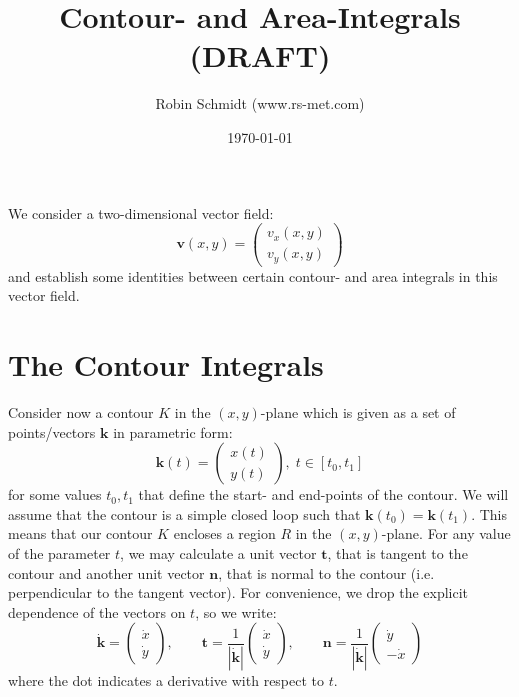 \title{Contour- and Area-Integrals (DRAFT)}
\author{Robin Schmidt (www.rs-met.com)}
\date{\today}
\maketitle

We consider a two-dimensional vector field:
\begin{equation}
 \mathbf{v}(x,y) = 
 \begin{pmatrix}
 v_x (x, y) \\
 v_y (x, y)
 \end{pmatrix}
\end{equation}
and establish some identities between certain contour- and area integrals in this vector field.

\section{The Contour Integrals}
Consider now a contour $K$ in the $(x,y)$-plane which is given as a set of points/vectors $\mathbf{k}$ in parametric form:
\begin{equation}
 \mathbf{k}(t) = 
 \begin{pmatrix}
 x (t) \\
 y (t)
 \end{pmatrix}, \; t \in [t_0, t_1]
\end{equation}
for some values $t_0, t_1$ that define the start- and end-points of the contour. We will assume that the contour is a simple closed loop such that $\mathbf{k}(t_0) = \mathbf{k}(t_1) $. This means that our contour $K$ encloses a region $R$ in the $(x,y)$-plane. For any value of the parameter $t$, we may calculate a unit vector $\mathbf{t}$, that is tangent to the contour and another unit vector $\mathbf{n}$, that is normal to the contour (i.e. perpendicular to the tangent vector). For convenience, we drop the explicit dependence of the vectors on $t$, so we write:
\begin{equation}
 \dot{\mathbf{k}}=
 \begin{pmatrix}
 \dot{x} \\
 \dot{y} 
 \end{pmatrix}, \qquad
 \mathbf{t} = \frac{1}{|\dot{\mathbf{k}}|}
 \begin{pmatrix}
 \dot{x} \\
 \dot{y}
 \end{pmatrix}, \qquad
 \mathbf{n} = \frac{1}{|\dot{\mathbf{k}}|}
 \begin{pmatrix}
 \dot{y} \\
 -\dot{x}
 \end{pmatrix} 
\end{equation}
where the dot indicates a derivative with respect to $t$. 

